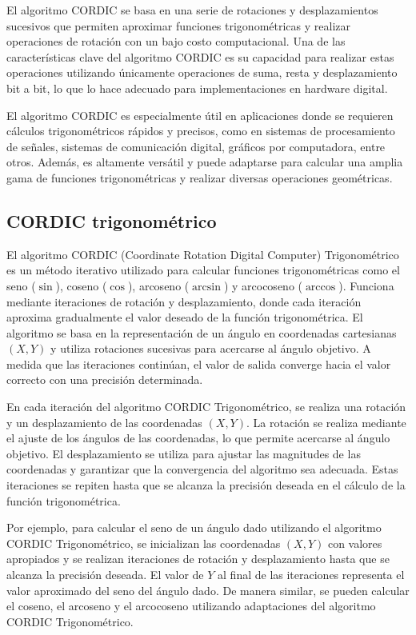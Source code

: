 \documentclass[12pt,a4paper, twoside]{article} %
\begin{document}
El algoritmo CORDIC se basa en una serie de rotaciones y desplazamientos sucesivos que permiten aproximar funciones trigonométricas y realizar operaciones de rotación con un bajo costo computacional. Una de las características clave del algoritmo CORDIC es su capacidad para realizar estas operaciones utilizando únicamente operaciones de suma, resta y desplazamiento bit a bit, lo que lo hace adecuado para implementaciones en hardware digital.

El algoritmo CORDIC es especialmente útil en aplicaciones donde se requieren cálculos trigonométricos rápidos y precisos, como en sistemas de procesamiento de señales, sistemas de comunicación digital, gráficos por computadora, entre otros. Además, es altamente versátil y puede adaptarse para calcular una amplia gama de funciones trigonométricas y realizar diversas operaciones geométricas.



\subsection{CORDIC trigonométrico}
\label{sec:orgdaca22c}


El algoritmo CORDIC (Coordinate Rotation Digital Computer) Trigonométrico es un método iterativo utilizado para calcular funciones trigonométricas como el seno ($\sin$), coseno ($\cos$), arcoseno ($\arcsin$) y arcocoseno ($\arccos$). Funciona mediante iteraciones de rotación y desplazamiento, donde cada iteración aproxima gradualmente el valor deseado de la función trigonométrica. El algoritmo se basa en la representación de un ángulo en coordenadas cartesianas $(X, Y)$ y utiliza rotaciones sucesivas para acercarse al ángulo objetivo. A medida que las iteraciones continúan, el valor de salida converge hacia el valor correcto con una precisión determinada.

En cada iteración del algoritmo CORDIC Trigonométrico, se realiza una rotación y un desplazamiento de las coordenadas $(X, Y)$. La rotación se realiza mediante el ajuste de los ángulos de las coordenadas, lo que permite acercarse al ángulo objetivo. El desplazamiento se utiliza para ajustar las magnitudes de las coordenadas y garantizar que la convergencia del algoritmo sea adecuada. Estas iteraciones se repiten hasta que se alcanza la precisión deseada en el cálculo de la función trigonométrica.

Por ejemplo, para calcular el seno de un ángulo dado utilizando el algoritmo CORDIC Trigonométrico, se inicializan las coordenadas $(X, Y)$ con valores apropiados y se realizan iteraciones de rotación y desplazamiento hasta que se alcanza la precisión deseada. El valor de $Y$ al final de las iteraciones representa el valor aproximado del seno del ángulo dado. De manera similar, se pueden calcular el coseno, el arcoseno y el arcocoseno utilizando adaptaciones del algoritmo CORDIC Trigonométrico.
\end{document}
